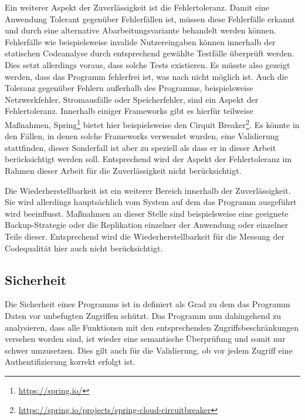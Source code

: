 \documentclass[
	oneside,  %
	ngerman, 
	final, 
	11pt, 
	a4paper, 
	1.1headlines, 
	headinclude=false, 
	footinclude=false, 
	mpinclude=false, 
	pagesize, 
	onecolumn, 
	titlepage, 
	parskip=half, 
	headsepline, 
	chapterprefix=false, 
	version=first, 
	listof=totoc, 
	bibliography=totoc, 
	toc=graduated, 
	fleqn
]{scrbook}
\begin{document}
Ein weiterer Aspekt der Zuverlässigkeit ist die Fehlertoleranz.
Damit eine Anwendung Tolerant gegenüber Fehlerfällen ist, müssen diese Fehlerfälle erkannt und durch eine alternative Abarbeitungsvariante behandelt werden können.
Fehlerfälle wie beispielsweise invalide Nutzereingaben können innerhalb der statischen Codeanalyse durch entsprechend gewählte Testfälle überprüft werden.
Dies setzt allerdings voraus, dass solche Tests existieren.
Es müsste also gezeigt werden, dass das Programm fehlerfrei ist, was nach \cite{Di1972} nicht möglich ist.
Auch die Toleranz gegenüber Fehlern außerhalb des Programms, beispielsweise Netzwerkfehler, Stromausfälle oder Speicherfehler, sind ein Aspekt der Fehlertoleranz.
Innerhalb einiger Frameworks gibt es hierfür teilweise Maßnahmen, Spring\footnote{\url{https://spring.io/}} bietet hier beispielsweise den Cirquit Breaker\footnote{\url{https://spring.io/projects/spring-cloud-circuitbreaker}}.
Es könnte in den Fällen, in denen solche Frameworks verwendet wurden, eine Validierung stattfinden, dieser Sonderfall ist aber zu speziell als dass er in dieser Arbeit berücksichtigt werden soll.
Entsprechend wird der Aspekt der Fehlertoleranz im Rahmen dieser Arbeit für die Zuverlässigkeit nicht berücksichtigt.

Die Wiederherstellbarkeit ist ein weiterer Bereich innerhalb der Zuverlässigkeit.
Sie wird allerdings hauptsächlich vom System auf dem das Programm ausgeführt wird beeinflusst.
Maßnahmen an dieser Stelle sind beispielsweise eine geeignete Backup-Strategie oder die Replikation einzelner der Anwendung oder einzelner Teile dieser.
Entsprechend wird die Wiederherstellbarkeit für die Messung der Codequalität hier auch nicht berücksichtigt.

\subsection{Sicherheit}
Die Sicherheit eines Programms ist in \cite{ISO-25010} definiert als Grad zu dem das Programm Daten vor unbefugten Zugriffen schützt.
Das Programm nun dahingehend zu analysieren, dass alle Funktionen mit den entsprechenden Zugriffsbeschränkungen versehen worden sind, ist wieder eine semantische Überprüfung und somit nur schwer umzusetzen.
Dies gilt auch für die Validierung, ob vor jedem Zugriff eine Authentifizierung korrekt erfolgt ist.
\end{document}
